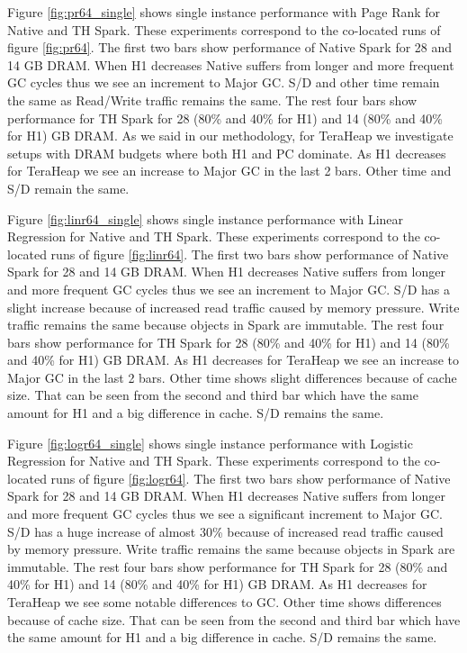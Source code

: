 Figure \ref{fig:pr64_single} shows single instance performance with Page Rank for Native and TH Spark. These experiments correspond to the co-located runs of figure \ref{fig:pr64}. The first two bars show performance of Native Spark for 28 and 14 GB DRAM. When H1 decreases Native suffers from longer and more frequent GC cycles thus we see an increment to Major GC. S/D and other time remain the same as Read/Write traffic remains the same. The rest four bars show performance for TH Spark for 28 (80\% and 40\% for H1) and 14 (80\% and 40\% for H1) GB DRAM. As we said in our methodology, for TeraHeap we investigate setups with DRAM budgets where both H1 and PC dominate. As H1 decreases for TeraHeap we see an increase to Major GC in the last 2 bars. Other time and S/D remain the same.

Figure \ref{fig:linr64_single} shows single instance performance with Linear Regression for Native and TH Spark. These experiments correspond to the co-located runs of figure \ref{fig:linr64}. The first two bars show performance of Native Spark for 28 and 14 GB DRAM. When H1 decreases Native suffers from longer and more frequent GC cycles thus we see an increment to Major GC. S/D has a slight increase because of increased read traffic caused by memory pressure. Write traffic remains the same because objects in Spark are immutable. The rest four bars show performance for TH Spark for 28 (80\% and 40\% for H1) and 14 (80\% and 40\% for H1) GB DRAM. As H1 decreases for TeraHeap we see an increase to Major GC in the last 2 bars. Other time shows slight differences because of cache size. That can be seen from the second and third bar which have the same amount for H1 and a big difference in cache. S/D remains the same.

Figure \ref{fig:logr64_single} shows single instance performance with Logistic Regression for Native and TH Spark. These experiments correspond to the co-located runs of figure \ref{fig:logr64}. The first two bars show performance of Native Spark for 28 and 14 GB DRAM. When H1 decreases Native suffers from longer and more frequent GC cycles thus we see a significant increment to Major GC. S/D has a huge increase of almost 30\% because of increased read traffic caused by memory pressure. Write traffic remains the same because objects in Spark are immutable. The rest four bars show performance for TH Spark for 28 (80\% and 40\% for H1) and 14 (80\% and 40\% for H1) GB DRAM. As H1 decreases for TeraHeap we see some notable differences to GC. Other time shows differences because of cache size. That can be seen from the second and third bar which have the same amount for H1 and a big difference in cache. S/D remains the same.

